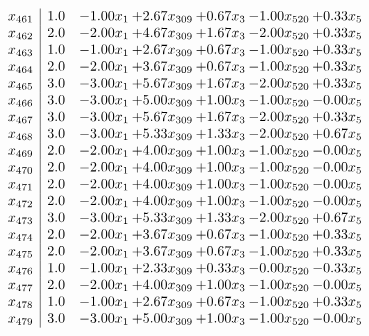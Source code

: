 \documentclass[8pt]{article}
\begin{document}
\[\begin{array}{c| c c@{\hskip 2pt} c@{\hskip 2pt} c@{\hskip 2pt} c@{\hskip 2pt} c@{\hskip 2pt} }
 x_{461}   &  1.0 & -1.00 x_{1} & +  2.67 x_{309} & +  0.67 x_{3} & -1.00 x_{520} & +  0.33 x_{5}\\
 x_{462}   &  2.0 & -2.00 x_{1} & +  4.67 x_{309} & +  1.67 x_{3} & -2.00 x_{520} & +  0.33 x_{5}\\
 x_{463}   &  1.0 & -1.00 x_{1} & +  2.67 x_{309} & +  0.67 x_{3} & -1.00 x_{520} & +  0.33 x_{5}\\
 x_{464}   &  2.0 & -2.00 x_{1} & +  3.67 x_{309} & +  0.67 x_{3} & -1.00 x_{520} & +  0.33 x_{5}\\
 x_{465}   &  3.0 & -3.00 x_{1} & +  5.67 x_{309} & +  1.67 x_{3} & -2.00 x_{520} & +  0.33 x_{5}\\
 x_{466}   &  3.0 & -3.00 x_{1} & +  5.00 x_{309} & +  1.00 x_{3} & -1.00 x_{520} & -0.00 x_{5}\\
 x_{467}   &  3.0 & -3.00 x_{1} & +  5.67 x_{309} & +  1.67 x_{3} & -2.00 x_{520} & +  0.33 x_{5}\\
 x_{468}   &  3.0 & -3.00 x_{1} & +  5.33 x_{309} & +  1.33 x_{3} & -2.00 x_{520} & +  0.67 x_{5}\\
 x_{469}   &  2.0 & -2.00 x_{1} & +  4.00 x_{309} & +  1.00 x_{3} & -1.00 x_{520} & -0.00 x_{5}\\
 x_{470}   &  2.0 & -2.00 x_{1} & +  4.00 x_{309} & +  1.00 x_{3} & -1.00 x_{520} & -0.00 x_{5}\\
 x_{471}   &  2.0 & -2.00 x_{1} & +  4.00 x_{309} & +  1.00 x_{3} & -1.00 x_{520} & -0.00 x_{5}\\
 x_{472}   &  2.0 & -2.00 x_{1} & +  4.00 x_{309} & +  1.00 x_{3} & -1.00 x_{520} & -0.00 x_{5}\\
 x_{473}   &  3.0 & -3.00 x_{1} & +  5.33 x_{309} & +  1.33 x_{3} & -2.00 x_{520} & +  0.67 x_{5}\\
 x_{474}   &  2.0 & -2.00 x_{1} & +  3.67 x_{309} & +  0.67 x_{3} & -1.00 x_{520} & +  0.33 x_{5}\\
 x_{475}   &  2.0 & -2.00 x_{1} & +  3.67 x_{309} & +  0.67 x_{3} & -1.00 x_{520} & +  0.33 x_{5}\\
 x_{476}   &  1.0 & -1.00 x_{1} & +  2.33 x_{309} & +  0.33 x_{3} & -0.00 x_{520} & -0.33 x_{5}\\
 x_{477}   &  2.0 & -2.00 x_{1} & +  4.00 x_{309} & +  1.00 x_{3} & -1.00 x_{520} & -0.00 x_{5}\\
 x_{478}   &  1.0 & -1.00 x_{1} & +  2.67 x_{309} & +  0.67 x_{3} & -1.00 x_{520} & +  0.33 x_{5}\\
 x_{479}   &  3.0 & -3.00 x_{1} & +  5.00 x_{309} & +  1.00 x_{3} & -1.00 x_{520} & -0.00 x_{5}\\

\end{array}\]
\end{document}
